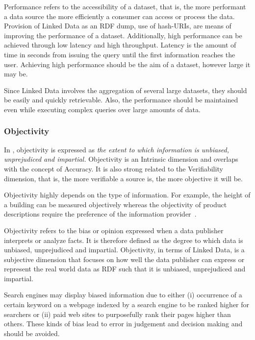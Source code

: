 \begin{definition}[Performance]
Performance refers to the accessibility of a dataset, that is, the more performant a data source the more efficiently a consumer can access or process the data. 
Provision of Linked Data as an RDF dump, use of hash-URIs, are means of improving the performance of a dataset. 
Additionally, high performance can be achieved through low latency and high throughput.
Latency is the amount of time in seconds from issuing the query until the first information reaches the user.
Achieving high performance should be the aim of a dataset, however large it may be. 
\end{definition}

Since Linked Data involves the aggregation of several large datasets, they should be easily and quickly retrievable.
Also, the performance should be maintained even while executing complex queries over large amounts of data. 

\subsubsection{Objectivity} 
In \cite{Bizerthesis}, objectivity is expressed as \emph{the extent to which information is unbiased, unprejudiced and impartial.}
Objectivity is an Intrinsic dimension and overlaps with the concept of Accuracy.
It is also strong related to the Verifiability dimension, that is, the more verifiable a source is, the more objective it will be.

Objectivity highly depends on the type of information. 
For example, the height of a building can be measured objectively whereas the objectivity of product descriptions require the preference of the information provider~\cite{Bizerthesis}.

\begin{definition}[Objectivity]
Objectivity refers to the bias or opinion expressed when a data publisher interprets or analyze facts.
It is therefore defined as the degree to which data is unbiased, unprejudiced and impartial. 
Objectivity, in terms of Linked Data, is a subjective dimension that focuses on how well the data publisher can express or represent the real world data as RDF such that it is unbiased, unprejudiced and impartial. 
\end{definition}

Search engines may display biased information due to either (i) occurrence of a certain keyword on a webpage indexed by a search engine to be ranked higher for searchers or (ii) paid web sites to purposefully rank their pages higher than others. 
These kinds of bias lead to error in judgement and decision making and should be avoided. 

